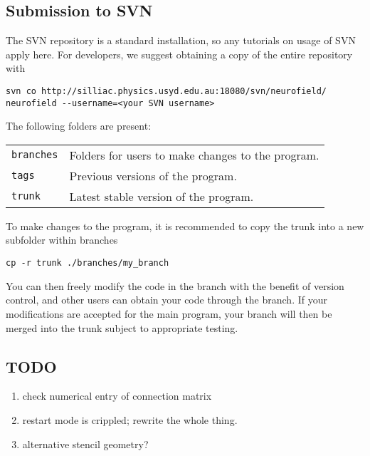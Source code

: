 \documentclass[12pt,a4paper]{article}
\newcommand{\type}[1]{ {\small\small\tt #1} }
\begin{document}


\subsection{Submission to SVN}
The SVN repository is a standard installation, so any tutorials on usage of SVN apply here. For developers, we suggest obtaining a copy of the entire repository with

\begin{lstlisting}
svn co http://silliac.physics.usyd.edu.au:18080/svn/neurofield/ neurofield --username=<your SVN username>
\end{lstlisting}
	
The following folders are present:

\begin{tabular}{l p{12cm}}
\type{branches}& Folders for users to make changes to the program.\\
\type{tags}& Previous versions of the program.\\
\type{trunk}& Latest stable version of the program.\\
\end{tabular}

To make changes to the program, it is recommended to copy the trunk into a new subfolder within branches

\begin{lstlisting}
cp -r trunk ./branches/my_branch
\end{lstlisting}
	
You can then freely modify the code in the branch with the benefit of version control, and other users can obtain your code through the branch. If your modifications are accepted for the main program, your branch will then be merged into the trunk subject to appropriate testing.

\subsection{TODO}
\begin{enumerate}
\item check numerical entry of connection matrix
\item restart mode is crippled; rewrite the whole thing.
\item alternative stencil geometry?
\end{enumerate}
\end{document}
